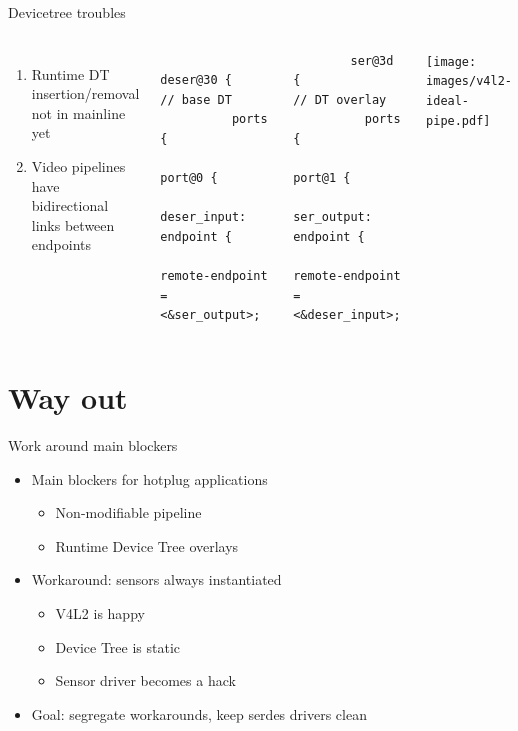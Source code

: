 \documentclass[xetex,table,aspectratio=169]{beamer}
\begin{document}
\begin{frame}[fragile]{Devicetree troubles}
  \begin{columns}
    \begin{enumerate}
    \item Runtime DT insertion/removal not in mainline yet
    \item Video pipelines have bidirectional links between endpoints
    \end{enumerate}

    \begin{verbatim}
        deser@30 {                               // base DT
          ports {
            port@0 {
              deser_input: endpoint {
                remote-endpoint = <&ser_output>;
    \end{verbatim}

    \begin{verbatim}
        ser@3d {                              // DT overlay
          ports {
            port@1 {
              ser_output: endpoint {
                remote-endpoint = <&deser_input>;
    \end{verbatim}

    \center\texttt{[image: images/v4l2-ideal-pipe.pdf]}
  \end{columns}
\end{frame}


\section{Way out}

\begin{frame}{Work around main blockers}
  \begin{itemize}
  \item Main blockers for hotplug applications
    \begin{itemize}
    \item Non-modifiable pipeline
    \item Runtime Device Tree overlays
    \end{itemize}
  \item Workaround: sensors always instantiated
    \begin{itemize}
    \item V4L2 is happy
    \item Device Tree is static
    \item Sensor driver becomes a hack
    \end{itemize}
  \item Goal: segregate workarounds, keep serdes drivers clean
  \end{itemize}
\end{frame}
\end{document}
